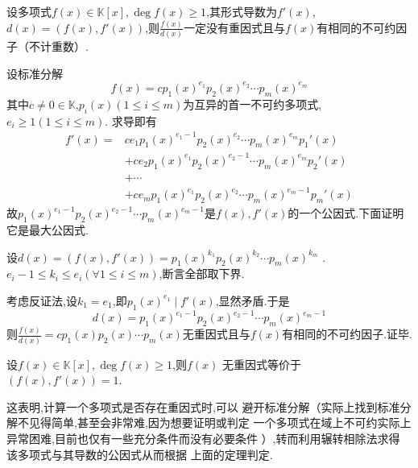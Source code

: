 \begin{green}
\begin{corollary}[相同不可约因子]\label{cor:相同不可约因子}
    设多项式$f\left(x\right)\in\mathbb{K}\left[x\right],\deg f\left(x\right)\geqslant 1$,其形式导数为$f'\left(x\right)$,$d\left(x\right)=\left(f\left(x\right),f'\left(x\right)\right)$,则$\displaystyle
    \frac{f\left(x\right)}{d\left(x\right)}$一定没有重因式且与$f\left(x\right)$有相同的不可约因子（不计重数）.
\end{corollary}
\begin{Proof}
设标准分解
\[
f\left(x\right)=cp_1\left(x\right)^{e_1}p_2\left(x\right)^{e_2}\cdots p_m\left(x\right)^{e_m}
\]
其中$c\neq 0\in\mathbb{K}$,$p_i\left(x\right)\left(1\leqslant i\leqslant m\right)$为互异的首一不可约多项式,$e_i\geqslant 1\left(1\leqslant i\leqslant m\right)$.
求导即有
\begin{align*}
    f'\left(x\right)=&ce_1p_1\left(x\right)^{e_1-1}p_2\left(x\right)^{e_2}\cdots p_m\left(x\right)^{e_m}p_1'\left(x\right)\\
    &+ce_2p_1\left(x\right)^{e_1}p_2\left(x\right)^{e_2-1}\cdots p_m\left(x\right)^{e_m}p_2'\left(x\right)\\
    &+\cdots\\
    &+ce_mp_1\left(x\right)^{e_1}p_2\left(x\right)^{e_2}\cdots p_m\left(x\right)^{e_m-1}p_m'\left(x\right)
\end{align*}
故$p_1\left(x\right)^{e_1-1}p_2\left(x\right)^{e_2-1}\cdots p_m\left(x\right)^{e_m-1}$是$f\left(x\right),f'\left(x\right)$的一个公因式.下面证明它是最大公因式.

设$d\left(x\right)=\left(f\left(x\right),f'\left(x\right)\right)=
p_1\left(x\right)^{k_1}p_2\left(x\right)^{k_2}\cdots p_m\left(x\right)^{k_m}$
.$e_i-1\leqslant k_i\leqslant 
e_i\left(\forall 1\leqslant i
\leqslant m\right)$,断言全部取下界.

考虑反证法,设$k_1=e_1$,即$p_1\left(x\right)^{e_1}\mid f'\left(x\right)$,显然矛盾.于是
\[
d\left(x\right)=p_1\left(x\right)^{e_1-1}p_2\left(x\right)^{e_2-1}\cdots p_m\left(x\right)^{e_m-1}
\]
则$\displaystyle
\frac{f\left(x\right)}{d\left(x\right)}=cp_1\left(x\right)p_2\left(x\right)
\cdots p_m\left(x\right)$无重因式且与$f\left(x\right)$有相同的不可约因子.证毕.
\end{Proof}
\end{green}
\begin{formal}
\begin{theorem}[重因式的判定定理]\label{thm:重因式的判定定理}
    设$f\left(x\right)\in\mathbb{K}\left[x\right],\deg f\left(x\right)\geqslant 1$,则$f\left(x\right)$
    无重因式等价于
    $\left(f\left(x\right),f'\left(x\right)\right)=1.$
\end{theorem}
\end{formal}
\begin{red}
\begin{remark}
    这表明,计算一个多项式是否存在重因式时,可以
    避开标准分解（实际上找到标准分解不见得简单,甚至会非常难,因为想要证明或判定
    一个多项式在域上不可约实际上异常困难,目前也仅有一些充分条件而没有必要条件
    ）,转而利用辗转相除法求得
    该多项式与其导数的公因式从而根据
    上面的定理判定.
\end{remark}
\end{red}
\newpage
